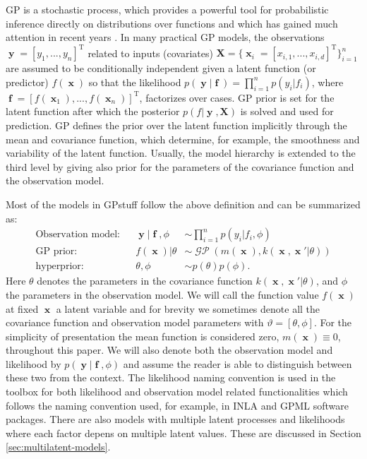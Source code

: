 \documentclass[twoside,11pt]{article}
\DeclareMathOperator{\x}{\mathbf{x}}
\DeclareMathOperator{\f}{\mathbf{f}}
\DeclareMathOperator{\y}{\mathbf{y}}
\DeclareMathOperator{\GP}{\mathcal{GP}}
\newcommand{\mb}{\mathbf}
\newcommand{\pkg}[1]{{\fontseries{b}\selectfont #1}}
\begin{document}
GP is a stochastic process, which provides a powerful tool for
probabilistic inference directly on distributions over functions
\citep[e.g.][]{OHagan:1978} and which has gained much attention in
recent years \citep[][]{Rasmussen+Williams:2006}. In many practical GP
models, the observations $\y = [y_1,...,y_n]^{\text{T}}$ related to
inputs (covariates) $\mb{X} = \{\x_i = [x_{i,1},...
,x_{i,d}]^{\text{T}} \}_{i=1}^n$ are assumed to be conditionally
independent given a latent function (or predictor) $f(\x)$ so that the
likelihood $p(\y|\f) = \prod_{i=1}^{n} p(y_i|f_i)$, where $\f =
[f(\x_1),...,f(\x_n)]^{\text{T}}$, factorizes over cases. GP prior is
set for the latent function after which the posterior $p(f|\y,\mb{X})$
is solved and used for prediction. GP defines the prior over the
latent function implicitly through the mean and covariance function,
which determine, for example, the smoothness and variability of the
latent function.  Usually, the model hierarchy is extended to the
third level by giving also prior for the parameters of the covariance
function and the observation model.

Most of the models in \pkg{GPstuff} follow the above definition and
can be summarized as:
%
\begin{align}
  \text{Observation model:}   &&  \y|\f,\phi   &\sim  \prod_{i=1}^{n} p(y_i|f_i, \phi) \label{likelihood}\\
  \text{GP prior:}   && f(\x)|\theta    &\sim  \GP\left(m(\x),  k(\x,\x'|\theta)\right) \label{GP_prior} \\
  \text{hyperprior:}   &&  \theta, \phi  &\sim  p(\theta)p(\phi). \label{hyper_prior}
\end{align}
%
Here $\theta$ denotes the parameters in the covariance function
$k(\x,\x'|\theta)$, and $\phi$ the parameters in the observation
model. We will call the function value $f(\x)$ at fixed $\x$ a latent
variable and for brevity we sometimes denote all the covariance
function and observation model parameters with $\vartheta = [\theta,
\phi]$. For the simplicity of presentation the mean function is
considered zero, $m(\x) \equiv 0$, throughout this paper. We will also
denote both the observation model and likelihood by $p(\y|\f,\phi)$
and assume the reader is able to distinguish between these two from
the context. The likelihood naming convention is used in the toolbox
for both likelihood and observation model related functionalities
which follows the naming convention used, for example, in \pkg{INLA}
\citep{Rue+Martino+Chopin:2009} and \pkg{GPML}
\citep{Rasmussen+Nickisch:2010} software packages. There are also
models with multiple latent processes and likelihoods where each
factor depens on multiple latent values. These are discussed in
Section \ref{sec:multilatent-models}.
\end{document}
